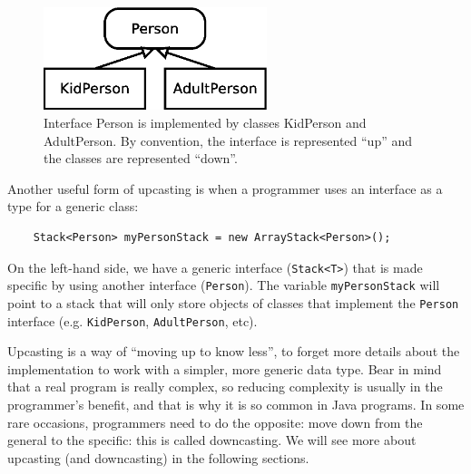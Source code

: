 \begin{figure}[hbtp]
  \centering
  \includegraphics[height=3cm]{gfx/class_diagram-person}
  \caption{Interface Person is implemented by classes KidPerson and
    AdultPerson. By convention, the interface is represented ``up'' and
    the classes are represented ``down''.} 
  \label{fig:updown}
\end{figure}

Another useful form of upcasting is when a programmer uses an
interface as a type for a generic class: 

\begin{verbatim}
    Stack<Person> myPersonStack = new ArrayStack<Person>();
\end{verbatim}

On the left-hand side, we have a generic interface (\verb+Stack<T>+) that is made
specific by using another interface (\verb+Person+). The variable
\verb+myPersonStack+ will point to a stack that will only store
objects of classes that implement the \verb+Person+ interface
(e.g. \verb+KidPerson+, \verb+AdultPerson+, etc). 

Upcasting is a way of ``moving up to know less'', to forget more
details about the implementation to work with a simpler, more generic
data type. Bear in mind that a real program is really complex, so
reducing complexity is usually in the programmer's benefit, and that
is why it is so common in Java programs. In some rare occasions,
programmers need to do the opposite: move down from the general to the
specific: this is called downcasting. 
We will see more about upcasting (and downcasting) in the following
sections. 



